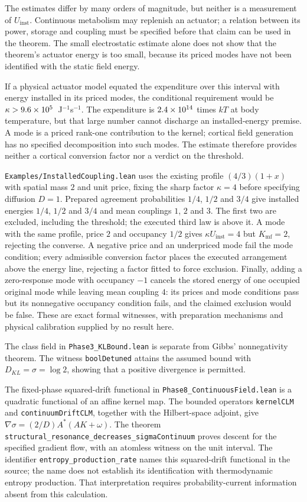 \documentclass{article}
\begin{document}
The estimates differ by many orders of magnitude, but neither is a measurement of $U_{\mathrm{inst}}$. Continuous metabolism may replenish an actuator; a relation between its power, storage and coupling must be specified before that claim can be used in the theorem. The small electrostatic estimate alone does not show that the theorem's actuator energy is too small, because its priced modes have not been identified with the static field energy.

If a physical actuator model equated the expenditure over this interval with energy installed in its priced modes, the conditional requirement would be $\kappa>9.6\times10^{5}$~J$^{-1}$s$^{-1}$. The expenditure is $2.4\times10^{14}$ times $kT$ at body temperature, but that large number cannot discharge an installed-energy premise. A mode is a priced rank-one contribution to the kernel; cortical field generation has no specified decomposition into such modes. The estimate therefore provides neither a cortical conversion factor nor a verdict on the threshold.

\nolinkurl{Examples/InstalledCoupling.lean} uses the existing profile
$(4/3)(1+x)$ with spatial mass $2$ and unit price, fixing the sharp factor
$\kappa=4$ before specifying diffusion $D=1$. Prepared agreement probabilities
$1/4$, $1/2$ and $3/4$ give installed energies $1/4$, $1/2$ and $3/4$ and
mean couplings $1$, $2$ and $3$. The first two are excluded, including the
threshold; the executed third law is above it. A mode with the same profile,
price $2$ and occupancy $1/2$ gives $\kappa U_{\mathrm{inst}}=4$ but
$K_{\mathrm{mf}}=2$, rejecting the converse. A negative price and an
underpriced mode fail the mode condition; every admissible conversion factor
places the executed arrangement above the energy line, rejecting a factor
fitted to force exclusion. Finally, adding a zero-response mode with occupancy
$-1$ cancels the stored energy of one occupied original mode while leaving
mean coupling $4$: its prices and mode conditions pass but its nonnegative
occupancy condition fails, and the claimed exclusion would be false.
These are exact formal witnesses, with preparation mechanisms and physical
calibration supplied by no result here.

The class field in \nolinkurl{Phase3_KLBound.lean} is separate from Gibbs' nonnegativity theorem. The witness \texttt{boolDetuned} attains the assumed bound with $D_{KL}=\sigma=\log2$, showing that a positive divergence is permitted.

The fixed-phase squared-drift functional in \nolinkurl{Phase8_ContinuousField.lean} is a quadratic functional of an affine kernel map. The bounded operators \texttt{kernelCLM} and \texttt{continuumDriftCLM}, together with the Hilbert-space adjoint, give $\nabla\sigma=(2/D)A^*(AK+\omega)$. The theorem \nolinkurl{structural_resonance_decreases_sigmaContinuum} proves descent for the specified gradient flow, with an atomless witness on the unit interval. The identifier \nolinkurl{entropy_production_rate} names this squared-drift functional in the source; the name does not establish its identification with thermodynamic entropy production. That interpretation requires probability-current information absent from this calculation.
\end{document}
